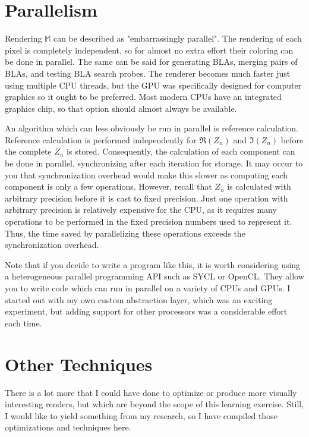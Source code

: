 \documentclass{article}
\begin{document}
\section{Parallelism}
\par Rendering $\mathbb{M}$ can be described as "embarrassingly parallel". The rendering of each pixel is completely independent, so for almost no extra effort their coloring can be done in parallel. The same can be said for generating BLAs, merging pairs of BLAs, and testing BLA search probes. The renderer becomes much faster just using multiple CPU threads, but the GPU was specifically designed for computer graphics so it ought to be preferred. Most modern CPUs have an integrated graphics chip, so that option should almost always be available.
\par An algorithm which can less obviously be run in parallel is reference calculation. Reference calculation is performed independently for $\Re(Z_n)$ and $\Im(Z_n)$ before the complete $Z_n$ is stored. Consequently, the calculation of each component can be done in parallel, synchronizing after each iteration for storage. It may occur to you that synchronization overhead would make this slower as computing each component is only a few operations. However, recall that $Z_n$ is calculated with arbitrary precision before it is cast to fixed precision. Just one operation with arbitrary precision is relatively expensive for the CPU, as it requires many operations to be performed in the fixed precision numbers used to represent it. Thus, the time saved by parallelizing these operations exceeds the synchronization overhead.
\par Note that if you decide to write a program like this, it is worth considering using a heterogeneous parallel programming API such as SYCL or OpenCL. They allow you to write code which can run in parallel on a variety of CPUs and GPUs. I started out with my own custom abstraction layer, which was an exciting experiment, but adding support for other processors was a considerable effort each time.
\section{Other Techniques}
\par There is a lot more that I could have done to optimize or produce more visually interesting renders, but which are beyond the scope of this learning exercise. Still, I would like to yield something from my research, so I have compiled those optimizations and techniques here. 
\end{document}
